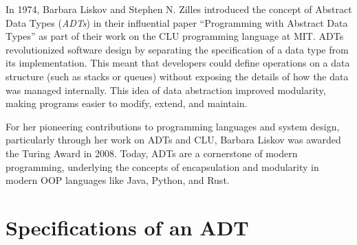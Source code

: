 \documentclass[oneside,11pt,dvipsnames]{book}
\begin{document}
In 1974, Barbara Liskov and Stephen N. Zilles introduced the concept of Abstract Data Types (\emph{ADTs}) in their influential paper ``Programming with Abstract Data Types'' as part of their work on the CLU programming language at MIT. ADTs revolutionized software design by separating the specification of a data type from its implementation. This meant that developers could define operations on a data structure (such as stacks or queues) without exposing the details of how the data was managed internally. This idea of data abstraction improved modularity, making programs easier to modify, extend, and maintain.

For her pioneering contributions to programming languages and system design, particularly through her work on ADTs and CLU, Barbara Liskov was awarded the Turing Award in 2008. Today, ADTs are a cornerstone of modern programming, underlying the concepts of encapsulation and modularity in modern OOP languages like Java, Python, and Rust.







\section{Specifications of an ADT}
\end{document}
